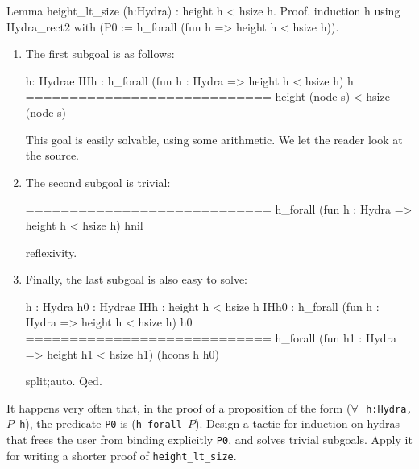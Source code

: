 \documentclass[a4paper]{book}
\begin{document}
 \begin{Coqsrc}
Lemma height_lt_size (h:Hydra) :
 height h < hsize h.
Proof.
  induction h using Hydra_rect2  with 
  (P0 :=  h_forall (fun h =>  height h < hsize h)).
 \end{Coqsrc}

\begin{enumerate}
\item The first subgoal is as follows:

\begin{Coqanswer}

  h: Hydrae
  IHh : h_forall (fun h : Hydra => height h < hsize h) h
  ============================
   height (node s) < hsize (node s) 

\end{Coqanswer}

This goal is easily solvable, using some arithmetic. We let the reader look at the source.

\item The second subgoal is trivial:

\begin{Coqanswer}

  ============================
    h_forall (fun h : Hydra => height h < hsize h) hnil

\end{Coqanswer}

\begin{Coqsrc}
  reflexivity.
\end{Coqsrc}

\item Finally, the last subgoal is also easy to solve:



\begin{Coqanswer}
  h : Hydra
  h0 : Hydrae
  IHh : height h < hsize h
  IHh0 : h_forall (fun h : Hydra => height h < hsize h) h0
  ============================
   h_forall (fun h1 : Hydra => height h1 < hsize h1) 
                 (hcons h h0)
\end{Coqanswer}  



\begin{Coqsrc}
 split;auto. 
Qed.   
\end{Coqsrc}

\end{enumerate}


\begin{exercise}
It happens very often that, in the proof of  a proposition of the form 
(\texttt{$\forall\,$ h:Hydra, $P$ h}), the predicate \texttt{P0}
is  (\texttt{h\_forall $P$}).  Design a tactic for induction on hydras that frees the user from binding explicitly \texttt{P0},  and solves trivial subgoals. Apply it for writing  a shorter proof of \texttt{height\_lt\_size}.
\end{exercise}
 
\end{document}
